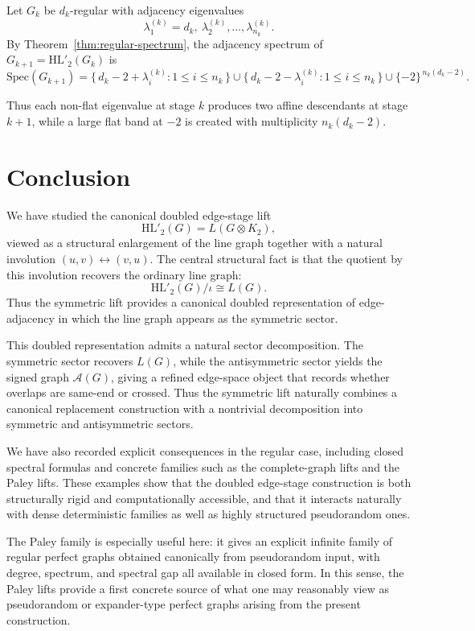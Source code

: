 \documentclass[11pt]{article}
\newcommand{\Spec}{\mathrm{Spec}}
\newcommand{\HL}{\mathrm{HL}}
\theoremstyle{plain}
\begin{document}
Let \(G_k\) be \(d_k\)-regular with adjacency eigenvalues
\[
\lambda_1^{(k)}=d_k,\ \lambda_2^{(k)},\dots,\lambda_{n_k}^{(k)}.
\]
By Theorem~\ref{thm:regular-spectrum}, the adjacency spectrum of \(G_{k+1}=\HL'_2(G_k)\) is
\[
\Spec(G_{k+1})
=
\{\,d_k-2+\lambda_i^{(k)}:1\le i\le n_k\,\}
\cup
\{\,d_k-2-\lambda_i^{(k)}:1\le i\le n_k\,\}
\cup
\{-2\}^{\,n_k(d_k-2)}.
\]

Thus each non-flat eigenvalue at stage \(k\) produces two affine descendants at stage \(k+1\),
while a large flat band at \(-2\) is created with multiplicity \(n_k(d_k-2)\).

\section{Conclusion}

We have studied the canonical doubled edge-stage lift
\[
\HL'_2(G)=L(G\otimes K_2),
\]
viewed as a structural enlargement of the line graph together with a natural involution
\((u,v)\leftrightarrow (v,u)\). The central structural fact is that the quotient by this involution
recovers the ordinary line graph:
\[
\HL'_2(G)/\iota \cong L(G).
\]
Thus the symmetric lift provides a canonical doubled representation of edge-adjacency in which the
line graph appears as the symmetric sector.

This doubled representation admits a natural sector decomposition. The symmetric sector recovers
\(L(G)\), while the antisymmetric sector yields the signed graph \(\mathcal A(G)\), giving a refined edge-space
object that records whether overlaps are same-end or crossed. Thus the symmetric lift naturally combines a
canonical replacement construction with a nontrivial decomposition into symmetric and antisymmetric sectors.

We have also recorded explicit consequences in the regular case, including closed spectral formulas and
concrete families such as the complete-graph lifts and the Paley lifts. These examples show that the
doubled edge-stage construction is both structurally rigid and computationally accessible, and that it
interacts naturally with dense deterministic families as well as highly structured pseudorandom ones.

The Paley family is especially useful here: it gives an explicit infinite family of regular perfect graphs
obtained canonically from pseudorandom input, with degree, spectrum, and spectral gap all available in
closed form. In this sense, the Paley lifts provide a first concrete source of what one may reasonably view
as pseudorandom or expander-type perfect graphs arising from the present construction.
\end{document}
